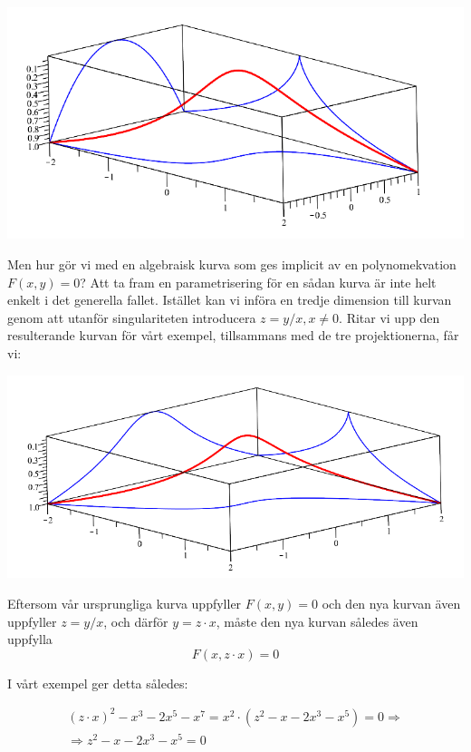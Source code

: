 \begin{center}
\includegraphics[scale=0.5]{Export/blowupex1_2.png}
\end{center}

Men hur gör vi med en algebraisk kurva som ges implicit av en polynomekvation $F(x,y)=0$? Att ta fram en parametrisering för en sådan kurva är inte helt enkelt i det generella fallet. Istället kan vi införa en tredje dimension till kurvan genom att utanför singulariteten introducera $z=y/x, x \neq 0$. Ritar vi upp den resulterande kurvan för vårt exempel, tillsammans med de tre projektionerna, får vi:

\begin{center}
\includegraphics[scale=0.5]{Export/blowupex1_3.png}
\end{center}

Eftersom vår ursprungliga kurva uppfyller $F(x,y)=0$ och den nya kurvan även uppfyller $z=y/x$, och därför $y=z\cdot x$, måste den nya kurvan således även uppfylla
\[F(x,z\cdot x)=0\]

I vårt exempel ger detta således:

\[
\begin{array}{c}
(z\cdot x)^2-x^3-2x^5-x^7 = x^2 \cdot \left(z^2-x-2x^3-x^5\right) = 0 \Longrightarrow\\[5pt]
\Longrightarrow z^2-x-2x^3-x^5=0\\
\end{array}
\]

